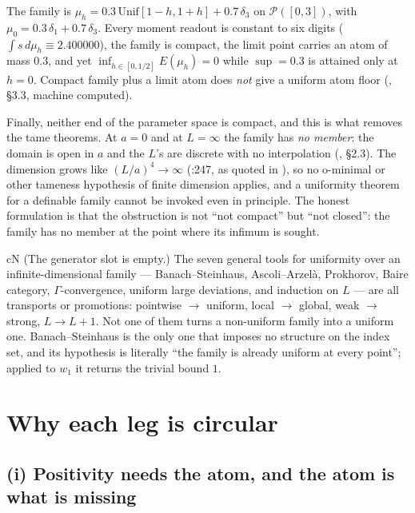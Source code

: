 \noindent The family is $\mu_h=0.3\,\mathrm{Unif}[1-h,1+h]+0.7\,\delta_3$ on $\mathcal{P}([0,3])$,
with $\mu_0=0.3\,\delta_1+0.7\,\delta_3$. Every moment readout is constant to six digits
($\int s\,d\mu_h\equiv2.400000$), the family is compact, the limit point carries an atom of mass
$0.3$, and yet $\inf_{h\in[0,1/2]}E(\mu_h)=0$ while $\sup=0.3$ is attained only at $h=0$. Compact
family plus a limit atom does \emph{not} give a uniform atom floor (, \S3.3, machine
computed).

Finally, neither end of the parameter space is compact, and this is what removes the tame
theorems. At $a=0$ and at $L=\infty$ the family has \emph{no member}: the domain is open in $a$ and
the $L$'s are discrete with no interpolation (, \S2.3). The dimension grows like
$(L/a)^4\to\infty$ (:247, as quoted in ), so no o-minimal or
other tameness hypothesis of finite dimension applies, and a uniformity theorem for a definable
family cannot be invoked even in principle. The honest formulation is that the obstruction is not
``not compact'' but ``not closed'': the family has no member at the point where its infimum is
sought.

\begin{claimbox}{cN}
 (The generator slot is empty.) The seven general tools for uniformity over an
infinite-dimensional family --- Banach--Steinhaus, Ascoli--Arzel\`a, Prokhorov, Baire category,
$\Gamma$-convergence, uniform large deviations, and induction on $L$ --- are all transports or
promotions: pointwise $\to$ uniform, local $\to$ global, weak $\to$ strong, $L\to L+1$. Not one of
them turns a non-uniform family into a uniform one. Banach--Steinhaus is the only one that imposes no
structure on the index set, and its hypothesis is literally ``the family is already uniform at every
point''; applied to $w_1$ it returns the trivial bound $1$.
\end{claimbox}

\section{Why each leg is circular}
\label{sec:reduction-legs}

\subsection{(i) Positivity needs the atom, and the atom is what is missing}

